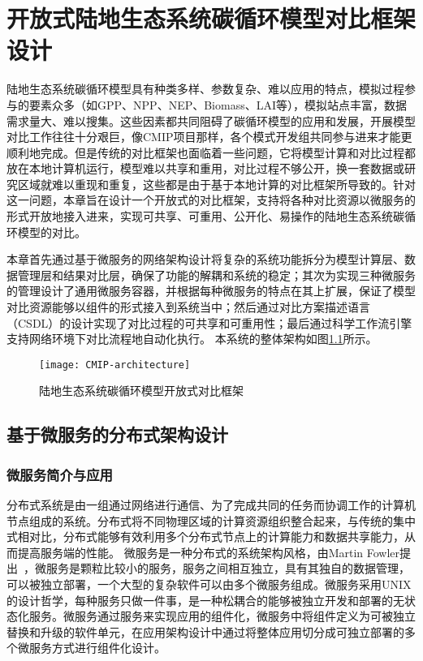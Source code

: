 \chapter{开放式陆地生态系统碳循环模型对比框架设计}
\label{chap:arch}

陆地生态系统碳循环模型具有种类多样、参数复杂、难以应用的特点，模拟过程参与的要素众多（如GPP、NPP、NEP、Biomass、LAI等），模拟站点丰富，数据需求量大、难以搜集。这些因素都共同阻碍了碳循环模型的应用和发展，开展模型对比工作往往十分艰巨，像CMIP项目那样，各个模式开发组共同参与进来才能更顺利地完成。但是传统的对比框架也面临着一些问题，它将模型计算和对比过程都放在本地计算机运行，模型难以共享和重用，对比过程不够公开，换一套数据或研究区域就难以重现和重复，这些都是由于基于本地计算的对比框架所导致的。针对这一问题，本章旨在设计一个开放式的对比框架，支持将各种对比资源以微服务的形式开放地接入进来，实现可共享、可重用、公开化、易操作的陆地生态系统碳循环模型的对比。

本章首先通过基于微服务的网络架构设计将复杂的系统功能拆分为模型计算层、数据管理层和结果对比层，确保了功能的解耦和系统的稳定；其次为实现三种微服务的管理设计了通用微服务容器，并根据每种微服务的特点在其上扩展，保证了模型对比资源能够以组件的形式接入到系统当中；然后通过对比方案描述语言（CSDL）的设计实现了对比过程的可共享和可重用性；最后通过科学工作流引擎支持网络环境下对比流程地自动化执行。
本系统的整体架构如图\ref{fig:CMIP-architecture}所示。

\begin{figure}[!htbp]
    \centering
    \texttt{[image: CMIP-architecture]}
    \caption{陆地生态系统碳循环模型开放式对比框架}
    \label{fig:CMIP-architecture}
\end{figure}

\section{基于微服务的分布式架构设计}
\subsection{微服务简介与应用}

分布式系统是由一组通过网络进行通信、为了完成共同的任务而协调工作的计算机节点组成的系统。分布式将不同物理区域的计算资源组织整合起来，与传统的集中式相对比，分布式能够有效利用多个分布式节点上的计算能力和数据共享能力，从而提高服务端的性能。
微服务是一种分布式的系统架构风格，由Martin Fowler提出~\cite{fowler2014microservices}，微服务是颗粒比较小的服务，服务之间相互独立，具有其独自的数据管理，可以被独立部署，一个大型的复杂软件可以由多个微服务组成。微服务采用UNIX的设计哲学，每种服务只做一件事，是一种松耦合的能够被独立开发和部署的无状态化服务。微服务通过服务来实现应用的组件化，微服务中将组件定义为可被独立替换和升级的软件单元，在应用架构设计中通过将整体应用切分成可独立部署的多个微服务方式进行组件化设计。

